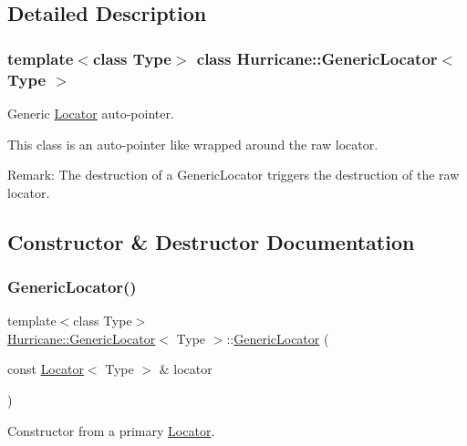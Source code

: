 \subsection{Detailed Description}
\subsubsection*{template$<$class Type$>$\newline
class Hurricane\+::\+Generic\+Locator$<$ Type $>$}

Generic \mbox{\hyperlink{classHurricane_1_1Locator}{Locator}} auto-\/pointer. 

This class is an auto-\/pointer like wrapped around the raw locator.

\begin{DoxyParagraph}{Remark\+: The destruction of a Generic\+Locator triggers the destruction of}
the raw locator. 
\end{DoxyParagraph}


\subsection{Constructor \& Destructor Documentation}
\mbox{\label{classHurricane_1_1GenericLocator_a878eae335b3f60fc66ec6362d84c2b3e}} 
\subsubsection{\texorpdfstring{Generic\+Locator()}{GenericLocator()}\hspace{0.1cm}{\footnotesize\ttfamily [1/3]}}
{\footnotesize\ttfamily template$<$class Type$>$ \\
\mbox{\hyperlink{classHurricane_1_1GenericLocator}{Hurricane\+::\+Generic\+Locator}}$<$ Type $>$\+::\mbox{\hyperlink{classHurricane_1_1GenericLocator}{Generic\+Locator}} (\begin{DoxyParamCaption}\item[{const \mbox{\hyperlink{classHurricane_1_1Locator}{Locator}}$<$ Type $>$ \&}]{locator }\end{DoxyParamCaption})\hspace{0.3cm}{\ttfamily [inline]}}

Constructor from a primary \mbox{\hyperlink{classHurricane_1_1Locator}{Locator}}.

